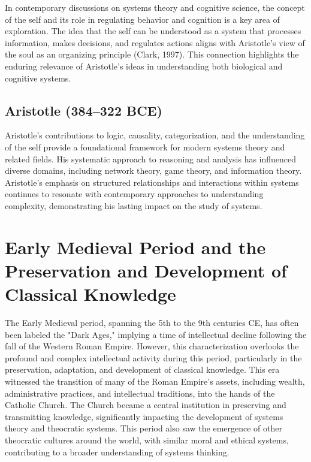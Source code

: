 \documentclass[twocolumn]{article}
\begin{document}
\textcolor{secondary}{In contemporary discussions on systems theory and cognitive science, the concept of the self and its role in regulating behavior and cognition is a key area of exploration. The idea that the self can be understood as a system that processes information, makes decisions, and regulates actions aligns with Aristotle’s view of the soul as an organizing principle (Clark, 1997). This connection highlights the enduring relevance of Aristotle’s ideas in understanding both biological and cognitive systems.}

\subsection{Aristotle (384–322 BCE)}

\textcolor{primary}{Aristotle’s contributions to logic, causality, categorization, and the understanding of the self provide a foundational framework for modern systems theory and related fields. His systematic approach to reasoning and analysis has influenced diverse domains, including network theory, game theory, and information theory. Aristotle’s emphasis on structured relationships and interactions within systems continues to resonate with contemporary approaches to understanding complexity, demonstrating his lasting impact on the study of systems.}

\section{Early Medieval Period and the Preservation and Development of Classical Knowledge}

\textcolor{primary}{The Early Medieval period, spanning the 5th to the 9th centuries CE, has often been labeled the "Dark Ages," implying a time of intellectual decline following the fall of the Western Roman Empire. However, this characterization overlooks the profound and complex intellectual activity during this period, particularly in the preservation, adaptation, and development of classical knowledge. This era witnessed the transition of many of the Roman Empire's assets, including wealth, administrative practices, and intellectual traditions, into the hands of the Catholic Church. The Church became a central institution in preserving and transmitting knowledge, significantly impacting the development of systems theory and theocratic systems. This period also saw the emergence of other theocratic cultures around the world, with similar moral and ethical systems, contributing to a broader understanding of systems thinking.}
\end{document}
